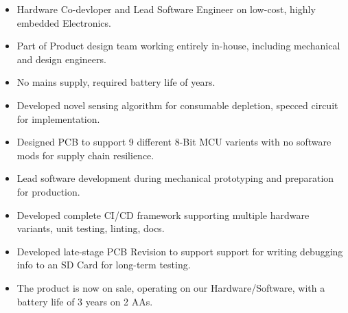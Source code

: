 {
  {\begin{itemize}
    \item Hardware Co-devloper and Lead Software Engineer on low-cost, highly embedded Electronics.
    \item Part of Product design team working entirely in-house, including mechanical and design engineers.
    \item No mains supply, required battery life of years. 
    \item Developed novel sensing algorithm for consumable depletion, specced circuit for implementation. 
    \item Designed PCB to support 9 different 8-Bit MCU varients with no software mods for supply chain resilience.
    \item Lead software development during mechanical prototyping and preparation for production. 
    \item Developed complete CI/CD framework supporting multiple hardware variants, unit testing, linting, docs. 
    \item Developed late-stage PCB Revision to support support for writing debugging info to an SD Card for long-term testing.
    \item The product is now on sale, operating on our Hardware/Software, with a battery life of 3 years on 2 AAs. 
  \end{itemize} 
  }
}
